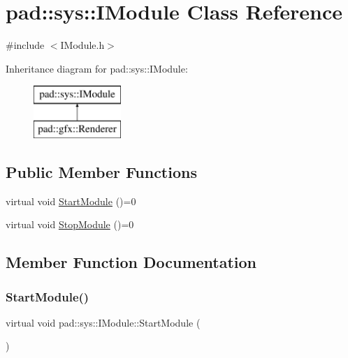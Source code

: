 \hypertarget{classpad_1_1sys_1_1_i_module}{}\section{pad\+:\+:sys\+:\+:I\+Module Class Reference}
\label{classpad_1_1sys_1_1_i_module}


{\ttfamily \#include $<$I\+Module.\+h$>$}

Inheritance diagram for pad\+:\+:sys\+:\+:I\+Module\+:\begin{figure}[H]
\begin{center}
\leavevmode
\includegraphics[height=2.000000cm]{classpad_1_1sys_1_1_i_module}
\end{center}
\end{figure}
\subsection*{Public Member Functions}
\begin{DoxyCompactItemize}
\item 
virtual void \mbox{\hyperlink{classpad_1_1sys_1_1_i_module_ad3d5abf3e4d20047b6b64da7db92d1ef}{Start\+Module}} ()=0
\item 
virtual void \mbox{\hyperlink{classpad_1_1sys_1_1_i_module_aa6c2b9d1e6b66aeee291923d4be87f0c}{Stop\+Module}} ()=0
\end{DoxyCompactItemize}


\subsection{Member Function Documentation}
\mbox{\label{classpad_1_1sys_1_1_i_module_ad3d5abf3e4d20047b6b64da7db92d1ef}} 
\subsubsection{\texorpdfstring{Start\+Module()}{StartModule()}}
{\footnotesize\ttfamily virtual void pad\+::sys\+::\+I\+Module\+::\+Start\+Module (\begin{DoxyParamCaption}{ }\end{DoxyParamCaption})\hspace{0.3cm}{\ttfamily [pure virtual]}}



